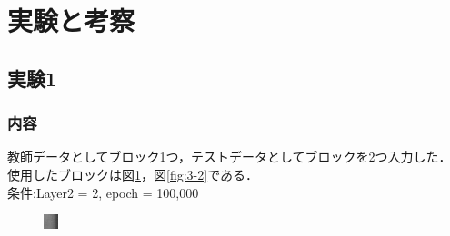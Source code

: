 \documentclass[twocolumn, a4j]{jsarticle}
\begin{document}
\section{実験と考察}
\subsection{実験1}
\subsubsection{内容}
教師データとしてブロック1つ，テストデータとしてブロックを2つ入力した．
使用したブロックは図\ref{fig:3-1}，図\ref{fig:3-2}である．
\\条件:Layer2 = 2, epoch = 100,000 
\begin{figure}[]
  \begin{minipage}[b]{0.49\columnwidth}
    \centering
    \includegraphics[width=0.9\columnwidth]{figure/block1.bmp}
    \label{fig:3-1}
  \end{minipage}
  \begin{minipage}[b]{0.49\linewidth}
    \centering

\end{minipage}
\end{figure}
\end{document}

